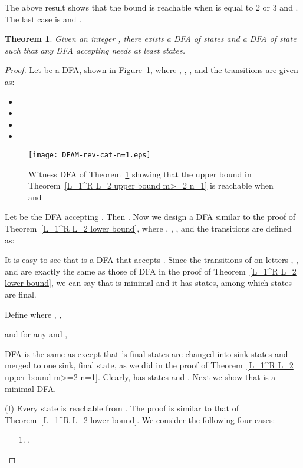 \documentclass[10pt]{article}
\newtheorem{theorem}{Theorem}
\begin{document}
The above result shows that the bound  is reachable when
 is equal to 2 or 3 and . The last case is  and .

\begin{theorem}
\label{L_1^R L_2 lower bound m>=4 n=1} Given an integer ,
there exists a DFA  of  states and a DFA  of  state such
that any DFA accepting  needs at least 
states.
\end{theorem}

\begin{proof}
Let  be a DFA,
shown in Figure~\ref{DFAM-rev-cat-n=1},
where , , ,
and the transitions are given as:
\begin{itemize}
\item 
\item 
\item 
\item 
\end{itemize}
\begin{figure}[ht]
  \begin{center}
  \texttt{[image: DFAM-rev-cat-n=1.eps]}
  \end{center}
  \caption{Witness DFA  of Theorem~\ref{L_1^R L_2 lower bound m>=4 n=1} showing that the upper bound in Theorem~\ref{L_1^R L_2 upper bound m>=2 n=1} is reachable when  and }
\label{DFAM-rev-cat-n=1}
\end{figure}
Let  be the DFA accepting . Then
. Now we design a DFA  similar to the proof of Theorem~\ref{L_1^R
L_2 lower bound}, where , , , and the
transitions are defined as:

It is easy to see that  is a DFA that accepts . Since the
transitions of  on letters , , and  are exactly the same
as those of DFA  in the proof of Theorem~\ref{L_1^R L_2 lower
bound}, we can say that  is minimal and it has  states,
among which  states are final.


Define  where , ,

and for any  and ,

DFA  is the same as  except that 's  final states
are changed into sink states and merged to one sink, final state, as
we did in the proof of Theorem~\ref{L_1^R L_2 upper bound m>=2 n=1}.
Clearly,  has  states and
. Next we show that  is a minimal DFA.

(I) Every state  is reachable from . The proof is
similar to that of  Theorem~\ref{L_1^R L_2 lower bound}. We consider
the following four cases:

\begin{itemize}
\item[{\rm 1.}].


\end{itemize}
\end{proof}
\end{document}

